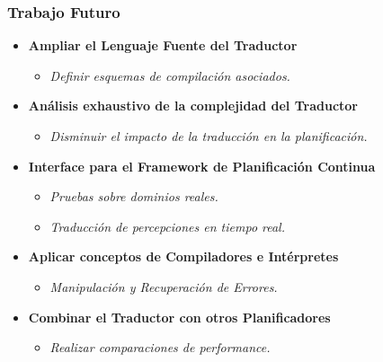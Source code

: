 \documentclass[bigger]{beamer}
\begin{document}
\begin{frame}[<+->]
\frametitle{Trabajo Futuro}
\label{sec-6.6}
\begin{itemize}

\item \textbf{Ampliar el Lenguaje Fuente del Traductor}
\label{sec-6.6.1}%
\begin{itemize}

\item \emph{Definir esquemas de compilación asociados.}\\
\label{sec-6.6.1.1}%
\end{itemize} %

\item \textbf{Análisis exhaustivo de la complejidad del Traductor}
\label{sec-6.6.2}%
\begin{itemize}

\item \emph{Disminuir el impacto de la traducción en la planificación.}\\
\label{sec-6.6.2.1}%
\end{itemize} %

\item \textbf{Interface para el Framework de Planificación Continua}
\label{sec-6.6.3}%
\begin{itemize}

\item \emph{Pruebas sobre dominios reales.}\\
\label{sec-6.6.3.1}%
\item \emph{Traducción de percepciones en tiempo real.}\\
\label{sec-6.6.3.2}%
\end{itemize} %

\item \textbf{Aplicar conceptos de Compiladores e Intérpretes}
\label{sec-6.6.4}%
\begin{itemize}

\item \emph{Manipulación y Recuperación de Errores.}\\
\label{sec-6.6.4.1}%
\end{itemize} %

\item \textbf{Combinar el Traductor con otros Planificadores}
\label{sec-6.6.5}%
\begin{itemize}

\item \emph{Realizar comparaciones de performance.}\\
\label{sec-6.6.5.1}%
\end{itemize} %
\end{itemize} %
\end{frame}
\end{document}

